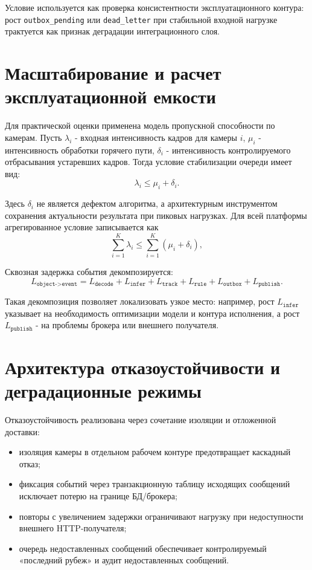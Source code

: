 Условие используется как проверка консистентности эксплуатационного контура: рост \texttt{outbox\_pending} или \texttt{dead\_letter} при стабильной входной нагрузке трактуется как признак деградации интеграционного слоя.

\section{Масштабирование и расчет эксплуатационной емкости}

Для практической оценки применена модель пропускной способности по камерам. Пусть \(\lambda_i\) - входная интенсивность кадров для камеры \(i\), \(\mu_i\) - интенсивность обработки горячего пути, \(\delta_i\) - интенсивность контролируемого отбрасывания устаревших кадров. Тогда условие стабилизации очереди имеет вид:
\begin{equation}
\lambda_i \leq \mu_i + \delta_i.
\end{equation}

Здесь \(\delta_i\) не является дефектом алгоритма, а архитектурным инструментом сохранения актуальности результата при пиковых нагрузках. Для всей платформы агрегированное условие записывается как
\begin{equation}
\sum_{i=1}^{K}\lambda_i \leq \sum_{i=1}^{K}(\mu_i + \delta_i),
\end{equation}
\where
{}

Сквозная задержка события декомпозируется:
\begin{equation}
L_{\texttt{object->event}} =
L_{\texttt{decode}} +
L_{\texttt{infer}} +
L_{\texttt{track}} +
L_{\texttt{rule}} +
L_{\texttt{outbox}} +
L_{\texttt{publish}}.
\end{equation}

Такая декомпозиция позволяет локализовать узкое место: например, рост \(L_{\texttt{infer}}\) указывает на необходимость оптимизации модели и контура исполнения, а рост \(L_{\texttt{publish}}\) - на проблемы брокера или внешнего получателя.

\section{Архитектура отказоустойчивости и деградационные режимы}

Отказоустойчивость реализована через сочетание изоляции и отложенной доставки:
\begin{itemize}
    \item изоляция камеры в отдельном рабочем контуре предотвращает каскадный отказ;
    \item фиксация событий через транзакционную таблицу исходящих сообщений исключает потерю на границе БД/брокера;
    \item повторы с увеличением задержки ограничивают нагрузку при недоступности внешнего HTTP-получателя;
    \item очередь недоставленных сообщений обеспечивает контролируемый «последний рубеж» и аудит недоставленных сообщений.
\end{itemize}

